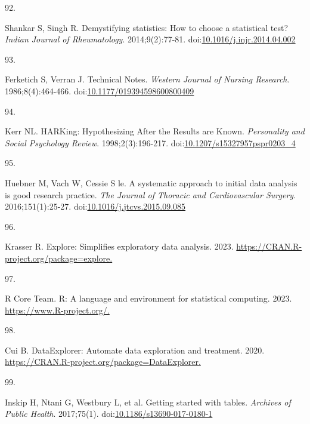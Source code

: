 \documentclass[
]{book}
\newlength{\cslhangindent}
\newlength{\csllabelwidth}
\newlength{\cslentryspacingunit} %
\newenvironment{CSLReferences}[2] %
 {%
  \setlength{\parindent}{0pt}
  \ifodd #1
  \let\oldpar\par
  \def\par{\hangindent=\cslhangindent\oldpar}
  \fi
  \setlength{\parskip}{#2\cslentryspacingunit}
 }%
 {}
\newcommand{\CSLLeftMargin}[1]{\parbox[t]{\csllabelwidth}{#1}}
\newcommand{\CSLRightInline}[1]{\parbox[t]{\linewidth - \csllabelwidth}{#1}\break}
\begin{document}
\begin{CSLReferences}{0}{0}
\leavevmode{}%
\CSLLeftMargin{92. }%
\CSLRightInline{Shankar S, Singh R. Demystifying statistics: How to choose a statistical test? \emph{Indian Journal of Rheumatology}. 2014;9(2):77-81. doi:\href{https://doi.org/10.1016/j.injr.2014.04.002}{10.1016/j.injr.2014.04.002}}

\leavevmode{}%
\CSLLeftMargin{93. }%
\CSLRightInline{Ferketich S, Verran J. Technical Notes. \emph{Western Journal of Nursing Research}. 1986;8(4):464-466. doi:\href{https://doi.org/10.1177/019394598600800409}{10.1177/019394598600800409}}

\leavevmode{}%
\CSLLeftMargin{94. }%
\CSLRightInline{Kerr NL. HARKing: Hypothesizing After the Results are Known. \emph{Personality and Social Psychology Review}. 1998;2(3):196-217. doi:\href{https://doi.org/10.1207/s15327957pspr0203_4}{10.1207/s15327957pspr0203\_4}}

\leavevmode{}%
\CSLLeftMargin{95. }%
\CSLRightInline{Huebner M, Vach W, Cessie S le. A systematic approach to initial data analysis is good research practice. \emph{The Journal of Thoracic and Cardiovascular Surgery}. 2016;151(1):25-27. doi:\href{https://doi.org/10.1016/j.jtcvs.2015.09.085}{10.1016/j.jtcvs.2015.09.085}}

\leavevmode{}%
\CSLLeftMargin{96. }%
\CSLRightInline{Krasser R. Explore: Simplifies exploratory data analysis. 2023. \href{https://CRAN.R-project.org/package=explore}{https://CRAN.R-project.org/package=explore.}}

\leavevmode{}%
\CSLLeftMargin{97. }%
\CSLRightInline{R Core Team. R: A language and environment for statistical computing. 2023. \href{https://www.R-project.org/}{https://www.R-project.org/.}}

\leavevmode{}%
\CSLLeftMargin{98. }%
\CSLRightInline{Cui B. DataExplorer: Automate data exploration and treatment. 2020. \href{https://CRAN.R-project.org/package=DataExplorer}{https://CRAN.R-project.org/package=DataExplorer.}}

\leavevmode{}%
\CSLLeftMargin{99. }%
\CSLRightInline{Inskip H, Ntani G, Westbury L, et al. Getting started with tables. \emph{Archives of Public Health}. 2017;75(1). doi:\href{https://doi.org/10.1186/s13690-017-0180-1}{10.1186/s13690-017-0180-1}}


\end{CSLReferences}
\end{document}
